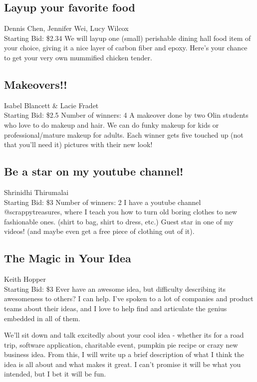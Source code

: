 \documentclass[11pt]{article}
\begin{document}
\subsection{Layup your favorite food}
Dennis Chen, Jennifer Wei, Lucy Wilcox
\\
Starting Bid: \$2.34
\newline
We will layup one (small) perishable dining hall food item of your choice, giving it a nice layer of carbon fiber and epoxy. Here's your chance to get your very own mummified chicken tender.
\subsection{Makeovers!!}
Isabel Blancett \& Lacie Fradet
\\
Starting Bid: \$2.5
\newline
Number of winners: 4
\newline
A makeover done by two Olin students who love to do makeup and hair.  We can do funky makeup for kids or professional/mature makeup for adults.  Each winner gets five touched up (not that you'll need it) pictures with their new look!
\subsection{Be a star on my youtube channel!}
Shrinidhi Thirumalai
\\
Starting Bid: \$3
\newline
Number of winners: 2
\newline
I have a youtube channel @scrappytreasures, where I teach you how to turn old boring clothes to new fashionable ones. (shirt to bag, shirt to dress, etc.) Guest star in one of my videos! (and maybe even get a free piece of clothing out of it).
\subsection{The Magic in Your Idea}
Keith Hopper
\\
Starting Bid: \$3
\newline
Ever have an awesome idea, but difficulty describing its awesomeness to others? I can help. I've spoken to a lot of companies and product teams about their ideas, and I love to help find and articulate the genius embedded in all of them.

We'll sit down and talk excitedly about your cool idea - whether its for a road trip, software application, charitable event, pumpkin pie recipe or crazy new business idea. From this, I will write up a brief description of what I think the idea is all about and what makes it great. I can't promise it will be what you intended, but I bet it will be fun.
\end{document}
